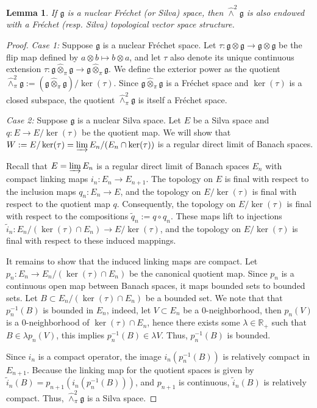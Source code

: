 \documentclass[11pt,reqno]{amsart}
\newtheorem{lemma}[theorem]{Lemma}
\theoremstyle{definition}
\numberwithin{equation}{section}
\begin{document}
\begin{lemma}\label{Lemma9.13}
If $\mathfrak{g}$ is a nuclear  Fréchet (or Silva) space, then $\hat\wedge^2 \mathfrak g$ is also endowed with a Fréchet (resp. Silva) topological vector space structure.
\end{lemma}

\begin{proof}
\textit{Case 1:}
Suppose $\mathfrak{g}$ is a nuclear Fréchet space. Let $\tau : \mathfrak{g} \otimes \mathfrak{g} \rightarrow \mathfrak{g} \otimes \mathfrak{g}$ be the flip map defined by $a \otimes b \mapsto b \otimes a$, and let $\tau$ also denote its unique continuous extension $\tau : \mathfrak{g} \hat{\otimes}_{\pi} \mathfrak{g} \rightarrow \mathfrak{g} \hat{\otimes}_{\pi} \mathfrak{g}$. We define the exterior power as the quotient $\hat\wedge^2_{\pi} \mathfrak{g} := (\mathfrak{g} \hat{\otimes}_{\pi} \mathfrak{g})/\ker(\tau)$. Since $\mathfrak{g} \hat{\otimes}_{\pi} \mathfrak{g}$ is a Fréchet space and $\ker(\tau)$ is a closed subspace, the quotient $\hat\wedge^2_{\pi} \mathfrak{g}$ is itself a Fréchet space.

\textit{Case 2:}
Suppose $\mathfrak{g}$ is a nuclear Silva space. Let $E$ be a Silva space and $q : E \rightarrow E/\ker(\tau)$ be the quotient map. We will show that $W := E/\ker(\tau) = \varinjlim E_n/(E_n \cap \ker(\tau))$ is a regular direct limit of Banach spaces. 

Recall that $E = \varinjlim E_n$ is a regular direct limit of Banach spaces $E_n$ with compact linking maps $i_n : E_n \rightarrow E_{n+1}$. The topology on $E$ is final with respect to the inclusion maps $q_n : E_n \rightarrow E$, and the topology on $E/\ker(\tau)$ is final with respect to the quotient map $q$. Consequently, the topology on $E/\ker(\tau)$ is final with respect to the compositions $\tilde{q}_n := q \circ q_n$. These maps lift to injections $\tilde{i}_n : E_n/(\ker(\tau) \cap E_n) \rightarrow E/\ker(\tau)$, and the topology on $E/\ker(\tau)$ is final with respect to these induced mappings.



It remains to show that the induced linking maps are compact. Let $p_n : E_n \to E_n/(\ker(\tau) \cap E_n)$ be the canonical quotient map. Since $p_n$ is a continuous open map between Banach spaces, it maps bounded sets to bounded sets. Let $B \subset E_n/(\ker(\tau) \cap E_n)$ be a bounded set. We note that that $p_n^{-1}(B)$ is bounded in $E_n$, indeed,  let $V \subset E_n$ be a 0-neighborhood, then ${p}_n(V)$ is a 0-neighborhood of $\ker(\tau) \cap E_n$, hence there exists some $\lambda \in \mathbb{R}_+$ such that $B \in \lambda {p}_n(V)$, this implies ${p}_n^{-1}(B) \in \lambda V$. Thus, $p_n^{-1}(B)$ is bounded.

Since $i_n$ is a compact operator, the image $i_n(p_n^{-1}(B))$ is relatively compact in $E_{n+1}$. Because the linking map for the quotient spaces is given by $\tilde{i}_n(B) = p_{n+1}(i_n(p_n^{-1}(B)))$, and $p_{n+1}$ is continuous, $\tilde{i}_n(B)$ is relatively compact. Thus, $\hat\wedge^2_{\pi} \mathfrak{g}$ is a Silva space.\end{proof}
\end{document}
